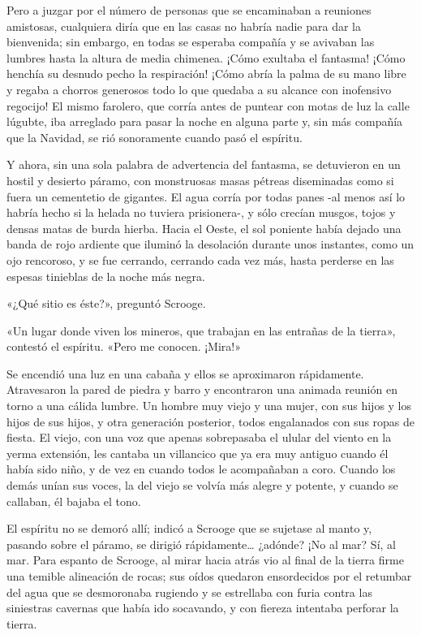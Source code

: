 \documentclass{novela}
\begin{document}
 Pero a juzgar por el número de personas que se encaminaban a reuniones amistosas, cualquiera diría que en las casas no habría nadie para dar la bienvenida; sin embargo, en todas se esperaba compañía y se avivaban las lumbres hasta la altura de media chimenea. ¡Cómo exultaba el fantasma! ¡Cómo henchía su desnudo pecho la respiración! ¡Cómo abría la palma de su mano libre y regaba a chorros generosos todo lo que quedaba a su alcance con inofensivo regocijo! El mismo farolero, que corría antes de puntear con motas de luz la calle lúgubte, iba arreglado para pasar la noche en alguna parte y, sin más compañía que la Navidad, se rió sonoramente cuando pasó el espíritu.

 Y ahora, sin una sola palabra de advertencia del fantasma, se detuvieron en un hostil y desierto páramo, con monstruosas masas pétreas diseminadas como si fuera un cementetio de gigantes. El agua corría por todas panes -al menos así lo habría hecho si la helada no tuviera prisionera-, y sólo crecían musgos, tojos y densas matas de burda hierba. Hacia el Oeste, el sol poniente había dejado una banda de rojo ardiente que iluminó la desolación durante unos instantes, como un ojo rencoroso, y se fue cerrando, cerrando cada vez más, hasta perderse en las espesas tinieblas de la noche más negra.

 «¿Qué sitio es éste?», preguntó Scrooge.

 «Un lugar donde viven los mineros, que trabajan en las entrañas de la tierra», contestó el espíritu. «Pero me conocen. ¡Mira!»

 Se encendió una luz en una cabaña y ellos se aproximaron rápidamente. Atravesaron la pared de piedra y barro y encontraron una animada reunión en torno a una cálida lumbre. Un hombre muy viejo y una mujer, con sus hijos y los hijos de sus hijos, y otra generación posterior, todos engalanados con sus ropas de fiesta. El viejo, con una voz que apenas sobrepasaba el ulular del viento en la yerma extensión, les cantaba un villancico que ya era muy antiguo cuando él había sido niño, y de vez en cuando todos le acompañaban a coro. Cuando los demás unían sus voces, la del viejo se volvía más alegre y potente, y cuando se callaban, él bajaba el tono.

 El espíritu no se demoró allí; indicó a Scrooge que se sujetase al manto y, pasando sobre el páramo, se dirigió rápidamente{\ldots} ¿adónde? ¡No al mar? Sí, al mar. Para espanto de Scrooge, al mirar hacia atrás vio al final de la tierra firme una temible alineación de rocas; sus oídos quedaron ensordecidos por el retumbar del agua que se desmoronaba rugiendo y se estrellaba con furia contra las siniestras cavernas que había ido socavando, y con fiereza intentaba perforar la tierra.
\end{document}
